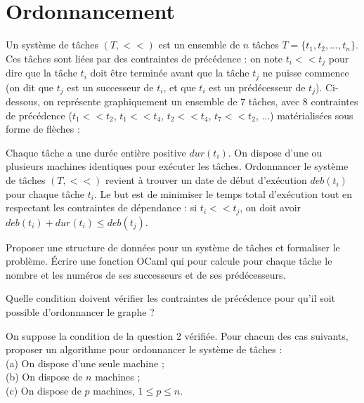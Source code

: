 \renewcommand{\SourceFile}{5-graphes/src/5-6.ml}

\section{Ordonnancement}

Un système de tâches $(T,<<)$ est un ensemble de $n$ tâches $T=\{t_1,t_2,...,t_n\}$. Ces tâches sont liées par des contraintes de précédence : on note $t_i << t_j$ pour dire que la tâche $t_i$ doit être terminée avant que la tâche $t_j$ ne puisse commence (on dit que $t_j$ est un successeur de $t_i$, et que $t_i$ est un prédécesseur de $t_j$). Ci-dessous, on représente graphiquement un ensemble de 7 tâches, avec 8 contraintes de précédence ($t_1<<t_2$, $t_1<<t_4$, $t_2<<t_4$, $t_7<<t_2$, ...) matérialisées sous forme de flèches :
\medskip

\medskip

Chaque tâche a une durée entière positive $dur(t_i)$. On dispose d'une ou plusieurs machines identiques pour exécuter les tâches. Ordonnancer le système de tâches $(T,<<)$ revient à trouver un date de début d'exécution $deb(t_i)$ pour chaque tâche $t_i$. Le but est de minimiser le temps total d'exécution tout en respectant les contraintes de dépendance : si $t_i << t_j$, on doit avoir $deb(t_i) + dur(t_i) \leq deb(t_j)$.

\Q
Proposer une structure de données pour un système de tâches et formaliser le problème. Écrire une fonction OCaml qui pour calcule pour chaque tâche le nombre et les numéros de ses successeurs et de ses prédécesseurs.

\Q
Quelle condition doivent vérifier les contraintes de précédence pour qu'il soit possible d'ordonnancer le graphe ?

\Q
On suppose la condition de la question 2 vérifiée. Pour chacun des cas suivants, proposer un algorithme pour ordonnancer le système de tâches :\\
(a) On dispose d'une seule machine ;\\
(b) On dispose de $n$ machines ;\\
(c) On dispose de $p$ machines, $1 \leq p \leq n$.

